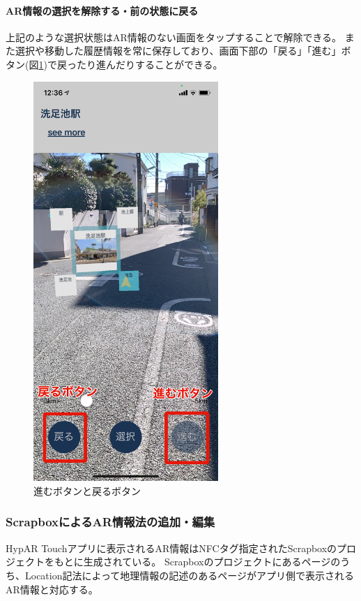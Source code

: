 \paragraph*{AR情報の選択を解除する・前の状態に戻る}
上記のような選択状態はAR情報のない画面をタップすることで解除できる。
また選択や移動した履歴情報を常に保存しており、画面下部の「戻る」「進む」ボタン(図\ref{fig:hypar_touch_history_button})で戻ったり進んだりすることができる。

\begin{figure}[h]
  \centering
  \includegraphics[width=70mm]{images/hypar_touch_history_button.png}
  \caption{進むボタンと戻るボタン} \label{fig:hypar_touch_history_button}
\end{figure}

\subsubsection{ScrapboxによるAR情報法の追加・編集}
HypAR Touchアプリに表示されるAR情報はNFCタグ指定されたScrapboxのプロジェクトをもとに生成されている。
Scrapboxのプロジェクトにあるページのうち、Location記法によって地理情報の記述のあるページがアプリ側で表示されるAR情報と対応する。

